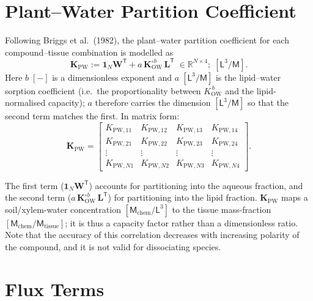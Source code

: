 \documentclass[12pt,a4paper]{article}
\newcommand{\R}{\mathbb{R}}
\newcommand{\oN}{\mathbf{1}_N}
\newcommand{\dM}{\mathsf{M}}
\newcommand{\dL}{\mathsf{L}}
\begin{document}
\section{Plant--Water Partition Coefficient}\label{sec:partition}

Following Briggs et al.\ (1982), the plant--water partition coefficient for each compound--tissue combination is modelled as
\begin{equation}\label{eq:kpw}
    \mathbf{K}_\mathrm{PW} := \oN\mathbf{W}^\mathsf{T} + a\,\mathbf{K}_\mathrm{OW}^{\circ b}\,\mathbf{L}^\mathsf{T} \;\in \R^{N\times 4};\; [\dL^3/\dM].
\end{equation}
Here $b\;[-]$ is a dimensionless exponent and $a\;[\dL^3/\dM]$ is the lipid--water sorption coefficient (i.e.\ the proportionality between $K_\mathrm{OW}^{\,b}$ and the lipid-normalised capacity); $a$ therefore carries the dimension $[\dL^3/\dM]$ so that the second term matches the first.  In matrix form:
\begin{equation*}
    \mathbf{K}_\mathrm{PW} = 
    \begin{bmatrix}
        K_{\mathrm{PW},11} & K_{\mathrm{PW},12} & K_{\mathrm{PW},13} & K_{\mathrm{PW},14}\\
        K_{\mathrm{PW},21} & K_{\mathrm{PW},22} & K_{\mathrm{PW},23} & K_{\mathrm{PW},24}\\
        \vdots & \vdots & \vdots & \vdots\\
        K_{\mathrm{PW},N1} & K_{\mathrm{PW},N2} & K_{\mathrm{PW},N3} & K_{\mathrm{PW},N4}
    \end{bmatrix}.
\end{equation*}

The first term ($\oN\mathbf{W}^\mathsf{T}$) accounts for partitioning into the aqueous fraction, and the second term ($a\,\mathbf{K}_\mathrm{OW}^{\circ b}\,\mathbf{L}^\mathsf{T}$) for partitioning into the lipid fraction.  $\mathbf{K}_\mathrm{PW}$ maps a soil/xylem-water concentration $[\dM_\mathrm{chem}/\dL^3]$ to the tissue mass-fraction $[\dM_\mathrm{chem}/\dM_\mathrm{tissue}]$; it is thus a capacity factor rather than a dimensionless ratio.  Note that the accuracy of this correlation decreases with increasing polarity of the compound, and it is not valid for dissociating species.


\section{Flux Terms}\label{sec:fluxes}
\end{document}
